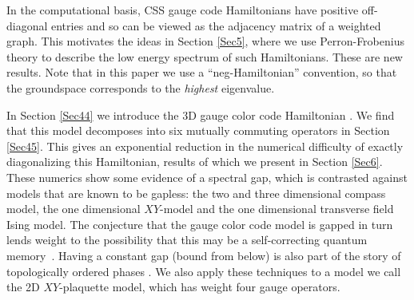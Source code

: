 \documentclass[11pt,oneside]{article}
\newcommand{\todo}[1]{\ \textcolor{red}{\{#1\}}\ }
\begin{document}



In the computational basis, 
CSS gauge code Hamiltonians have positive off-diagonal
entries and so can be viewed as the adjacency matrix
of a weighted graph.
This motivates the ideas in Section \ref{Sec5}, where 
we use Perron-Frobenius theory to
describe the low energy spectrum of such Hamiltonians.
These are new results.
Note that in this paper we use a ``neg-Hamiltonian'' convention,
so that the groundspace corresponds to the \emph{highest} eigenvalue.

In Section \ref{Sec44} we introduce the 3D gauge color code Hamiltonian%
\cite{Bombin2015,Bombin2015single,Kubica2015}.
We find that this model 
decomposes into six mutually commuting operators in Section \ref{Sec45}.
This gives an exponential reduction in the numerical
difficulty of exactly diagonalizing this Hamiltonian,
results of which we present in Section \ref{Sec6}.
These numerics show some evidence of a spectral
gap, which is contrasted against models that are known
to be gapless: the two and three dimensional compass model,
the one dimensional $XY$-model and 
the one dimensional transverse field Ising model.
The conjecture that the gauge color code model is gapped
in turn lends weight to the possibility that this may
be a self-correcting quantum memory~\cite{Brown2016}.
Having a constant gap (bound from below)
is also part of the story of topologically ordered phases
\cite{Kitaev2003,Brown2016}.
We also apply these techniques to a model
we call the 2D $XY$-plaquette model,
which has weight four gauge operators.
\end{document}

